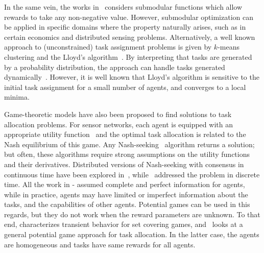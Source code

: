 \documentclass{IEEEtran}
\newcommand{\marginn}[1]{\marginpar{\color{blue}\tiny\ttfamily#1}}
\newcommand{\margin}[1]{\marginpar{\color{magenta}\tiny\ttfamily#1}}
\begin{document}
In the same vein, the works
in~\cite{NR-SSK:23,JV:08, GC-CC-MP-JV:11} considers submodular
functions which allow rewards to take any non-negative value. However,
submodular optimization can be applied in specific domains where the
property naturally arises, such as in certain economics and
distributed sensing problems.  Alternatively, a well known approach to
(unconstrained) task assignment problems is given by $k$-means
clustering and the Lloyd's algorithm~\cite{SL:82}. 
By interpreting that tasks are generated by a probability distribution,
the approach can handle tasks generated
dynamically~\cite{MS-YDM-ME:18,MS-ME:18,JC-SM-TK-FB:02-tra,EF-FB:03r}. 
However, it is well known that Lloyd's algorithm is sensitive to the
initial task assignment for a small number of agents, and converges to
a local minima.

Game-theoretic models have also been proposed to find solutions to
task allocation problems. For sensor networks, each agent is equipped
with an appropriate utility function~\cite{MZ-SM:10,JRM-GA-JSS:09,RK-RC-DG-JRM:22}
and the optimal task allocation is related to the Nash equilibrium of this
game. Any Nash-seeking~\cite{PF-MK-TB:10} algorithm returns a
solution; but often, these algorithms require strong assumptions on
the utility functions and their derivatives. Distributed versions of
Nash-seeking with consensus in continuous time have been explored
in~\cite{MY-GH:17,ZD-XN:18}, while~\cite{JK-AN-UVS:12,FS-LP:16}
addressed the problem in discrete time. All the work in
\cite{MY-GH:17}-\cite{FS-LP:16} assumed complete and perfect
information for agents, while in practice, agents may have limited or
imperfect information about the tasks, and the capabilities of other
agents. Potential games can be used in this regards, but they do not
work when the reward parameters are unknown. To that end,
\cite{RK-RC-DG-JRM:22} characterizes transient behavior for set
covering games, and~\cite{ACC-RAM-RK-NRJ:10} looks at a general
potential game approach for task allocation. In the latter case, the
agents are homogeneous and tasks have same rewards for all agents.
\end{document}
